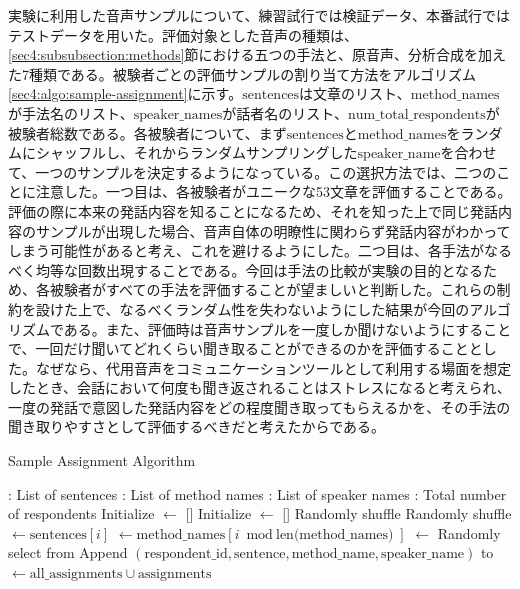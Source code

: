\documentclass[12pt]{jarticle}
\numberwithin{equation}{section}    %
\numberwithin{figure}{section}      %
\numberwithin{table}{section}      %
\begin{document}
実験に利用した音声サンプルについて、練習試行では検証データ、本番試行ではテストデータを用いた。評価対象とした音声の種類は、\ref{sec4:subsubsection:methods}節における五つの手法と、原音声、分析合成を加えた7種類である。被験者ごとの評価サンプルの割り当て方法をアルゴリズム\ref{sec4:algo:sample-assignment}に示す。$\text{sentences}$は文章のリスト、$\text{method\_names}$が手法名のリスト、$\text{speaker\_names}$が話者名のリスト、$\text{num\_total\_respondents}$が被験者総数である。各被験者について、まず$\text{sentences}$と$\text{method\_names}$をランダムにシャッフルし、それからランダムサンプリングした$\text{speaker\_name}$を合わせて、一つのサンプルを決定するようになっている。この選択方法では、二つのことに注意した。一つ目は、各被験者がユニークな53文章を評価することである。評価の際に本来の発話内容を知ることになるため、それを知った上で同じ発話内容のサンプルが出現した場合、音声自体の明瞭性に関わらず発話内容がわかってしまう可能性があると考え、これを避けるようにした。二つ目は、各手法がなるべく均等な回数出現することである。今回は手法の比較が実験の目的となるため、各被験者がすべての手法を評価することが望ましいと判断した。これらの制約を設けた上で、なるべくランダム性を失わないようにした結果が今回のアルゴリズムである。また、評価時は音声サンプルを一度しか聞けないようにすることで、一回だけ聞いてどれくらい聞き取ることができるのかを評価することとした。なぜなら、代用音声をコミュニケーションツールとして利用する場面を想定したとき、会話において何度も聞き返されることはストレスになると考えられ、一度の発話で意図した発話内容をどの程度聞き取ってもらえるかを、その手法の聞き取りやすさとして評価するべきだと考えたからである。

\begin{algorithm}
    \caption{Sample Assignment Algorithm}
    \label{sec4:algo:sample-assignment}
    \begin{algorithmic}[1]
        \Require {}: List of sentences
        \Require {}: List of method names
        \Require {}: List of speaker names
        \Require {}: Total number of respondents
        \State Initialize  $\gets$ []
        \State Initialize  $\gets$ []
        \State Randomly shuffle 
        \State Randomly shuffle 
        \State {} $\gets \text{sentences}[i]$
        \State {} $\gets \text{method\_names}[i \bmod \text{len(method\_names)}]$
        \State {} $\gets$ Randomly select from 
        \State Append $(\text{respondent\_id}, \text{sentence}, \text{method\_name}, \text{speaker\_name})$ to 
        \EndFor
        \State {} $\gets \text{all\_assignments} \cup \text{assignments}$
        \EndFor
        \State \Return {}
    \end{algorithmic}
\end{algorithm}
\end{document}
